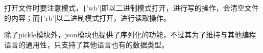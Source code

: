 \documentclass[fontset=ubuntu]{ctexart}
\begin{document}
打开文件时要注意模式，\texttt|'wb'|即以二进制模式打开，进行写的操作，会清空文件的内容；而\texttt|'rb'|以二进制模式打开，进行读取操作。

除了pickle模块外，json模块也提供了序列化的功能，不过其为了维持与其他编程语言的通用性，只支持了其他语言也有的数据类型。
\end{document}
